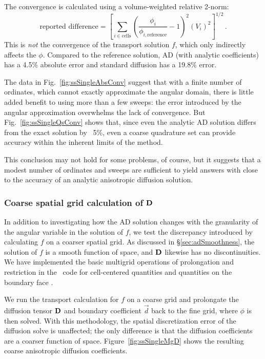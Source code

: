 The convergence is calculated using a volume-weighted relative 2-norm:
\begin{equation}\label{eq:rel2norm}
  \text{reported difference} =
  \left[ \sum_{i \in \text{cells}} \left(
  \frac{\phi_i}{\phi_{i,\text{reference}}} - 1 \right)^2 (V_i)^2\right]^{1/2} \,.
\end{equation}
This is \emph{not} the convergence of the transport solution $f$, which only
indirectly affects the $\phi$.
Compared to the reference solution, AD (with analytic coefficients) has a 4.5\%
absolute error and standard diffusion has a 19.8\% error.

The data in Fig.~\ref{fig:ssSingleAbsConv} suggest that with a finite number of
ordinates, which cannot exactly
approximate the angular domain, there is little added benefit to using more than
a few sweeps: the error introduced by the angular approximation overwhelms
the lack of convergence. But Fig.~\ref{fig:ssSingleQsConv} shows that, since
even the analytic AD solution differs from the exact solution by ~5\%, even a
coarse quadrature set can provide accuracy within the inherent limits of the
method.

This conclusion may not hold for some problems, of course, but it suggests that
a modest number of ordinates and sweeps are sufficient to yield answers with
close to the accuracy of an analytic anisotropic diffusion solution.

\clearpage
\subsubsection{Coarse spatial grid calculation of \texorpdfstring{$\mathbf{D}$}{D}}

In addition to investigating how the AD solution changes with the granularity of
the angular variable in the solution of $f$, we test the discrepancy
introduced by calculating $f$ on a coarser spatial grid. As discussed in
\S\ref{sec:adSmoothness}, the solution of $f$ is a smooth function of space, and
$\mathbf{D}$ likewise has no discontinuities. We have implemented the basic
multigrid operations of prolongation and restriction in the \pytrt\ code
for cell-centered quantities and quantities on the boundary face \cite{Pytrt}.

We run the transport calculation for $f$ on a coarse grid and prolongate the
diffusion tensor $\mathbf{D}$ and boundary coefficient $\vec{d}$ back to the fine
grid, where $\phi$
is then solved. With this methodology, the spatial discretization error of the
diffusion solve is unaffected; the only difference is that the diffusion
coefficients are a coarser function of space. Figure~\ref{fig:ssSingleMgD} shows
the resulting coarse anisotropic diffusion coefficients.

